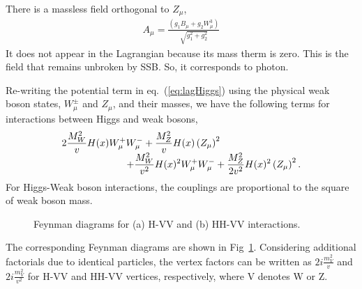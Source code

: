 There is a massless field orthogonal to $Z_\mu$,  
\begin{eqnarray} 
A_\mu = \frac{\left( g_1 B_\mu + g_2 W_\mu^3 \right)}{\sqrt{g_1^2+g_2^2}}  
\end{eqnarray}
It does not appear in the Lagrangian because its mass therm is zero.
This is the field that remains unbroken by SSB. So, it corresponds to photon. 

Re-writing the potential term in eq.~(\ref{eq:lagHiggs})
using the physical weak boson states, $W_\mu^\pm$ and $Z_\mu$,
and their masses, we have the following terms for interactions between Higgs and weak bosons,
\begin{eqnarray}
\begin{array}{ccc} \multicolumn{2}{c}{\displaystyle 
2\frac{M_W^2}{v} H(x) W^+_\mu W^-_\mu
+ \frac{M_Z^2}{v} H(x) \left( Z_\mu \right)^2
} & \\ & \multicolumn{2}{c}{\hspace{2cm} \displaystyle
+ \frac{M_W^2}{v^2} H(x)^2 W^+_\mu W^-_\mu 
+\frac{M_Z^2}{2v^2} H(x)^2 \left( Z_\mu \right)^2.
} \end{array}   
\end{eqnarray} 
For Higgs-Weak boson interactions, the couplings are proportional to the square 
of weak boson mass.
\begin{figure}[htp]
\centering
\vspace{1cm}
\hspace{1cm}
\caption{ Feynman diagrams for (a) H-VV and (b) HH-VV interactions.
}
\vspace{0.5cm}
\label{fig:fd_HVterm}
\end{figure}
The corresponding Feynman diagrams are shown in Fig~\ref{fig:fd_HVterm}. 
Considering additional factorials due to identical particles, the 
vertex factors can be written as $\displaystyle 2i \frac {m_V^2}{v}$ 
and $\displaystyle 2i \frac{m_V^2}{v^2}$ for H-VV and HH-VV vertices, respectively, 
where V denotes W or Z. 

